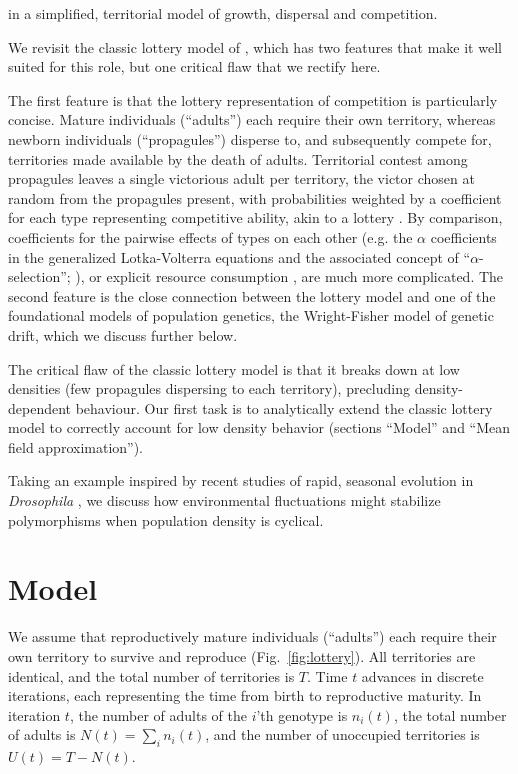 \documentclass[11pt]{article}
\begin{document}
in a simplified, territorial model of growth, dispersal and competition. 

We revisit the classic lottery model of \cite{chesson_1981}, which has two features that make it well suited for this role, but one critical flaw that we rectify here.

The first feature is that the lottery representation of competition is  particularly concise. Mature individuals (``adults'') each require their own territory, whereas newborn individuals (``propagules'') disperse to, and subsequently compete for, territories made available by the death of adults. Territorial contest among propagules leaves a single victorious adult per territory, the victor chosen at random from the propagules present, with probabilities weighted by a coefficient for each type representing competitive ability, akin to a lottery \citep{sale_77}. By comparison, coefficients for the pairwise effects of types on each other (e.g. the $\alpha$ coefficients in the generalized Lotka-Volterra equations and the associated concept of ``$\alpha$-selection''; \citealt{gill_1974,case_1974,joshi_2001}), or  explicit resource consumption \citep{tilman_1982}, are much more complicated. The second feature is the close connection between the lottery model and one of the foundational models of population genetics, the Wright-Fisher model of genetic drift, which we discuss further below. 

The critical flaw of the classic lottery model is that it breaks down at low densities (few propagules dispersing to each territory), precluding density-dependent behaviour. Our first task is to analytically extend the classic lottery model to correctly account for low density behavior (sections ``Model'' and ``Mean field approximation'').

Taking an example inspired by recent studies of rapid, seasonal evolution in \textit{Drosophila} \citep{bergland_14}, we discuss how environmental fluctuations might stabilize polymorphisms when population density is cyclical. 
 
\section*{Model}\label{sec:model}

We assume that reproductively mature individuals (``adults'') each require their own territory to survive and reproduce (Fig.~\ref{fig:lottery}). All territories are identical, and the total number of territories is $T$. Time $t$ advances in discrete iterations, each representing the time from birth to reproductive maturity. In iteration $t$, the number of adults of the $i$'th genotype is $n_i(t)$, the total number of adults is $N(t)=\sum_i n_i(t)$, and the number of unoccupied territories is $U(t)=T-N(t)$. 
\end{document}
